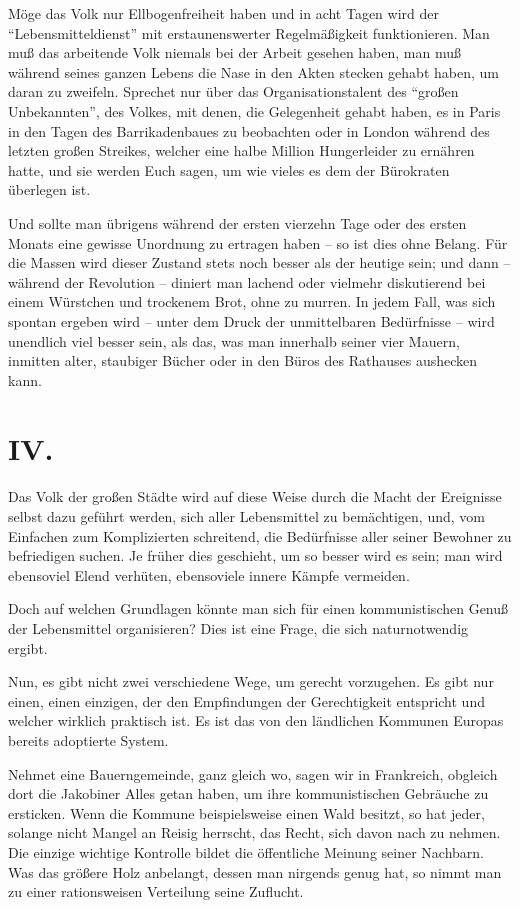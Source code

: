 \documentclass{scrbook}
\begin{document}
Möge das Volk nur Ellbogenfreiheit haben und in acht Tagen wird der ``Lebensmitteldienst'' mit erstaunenswerter Regelmäßigkeit funktionieren. Man muß das arbeitende Volk niemals bei der Arbeit gesehen haben, man muß während seines ganzen Lebens die Nase in den Akten stecken gehabt haben, um daran zu zweifeln. Sprechet nur über das Organisationstalent des ``großen Unbekannten'', des Volkes, mit denen, die Gelegenheit gehabt haben, es in Paris in den Tagen des Barrikadenbaues zu beobachten oder in London während des letzten großen Streikes, welcher eine halbe Million Hungerleider zu ernähren hatte, und sie werden Euch sagen, um wie vieles es dem der Bürokraten überlegen ist.

Und sollte man übrigens während der ersten vierzehn Tage oder des ersten Monats eine gewisse Unordnung zu ertragen haben – so ist dies ohne Belang. Für die Massen wird dieser Zustand stets noch besser als der heutige sein; und dann – während der Revolution – diniert man lachend oder vielmehr diskutierend bei einem Würstchen und trockenem Brot, ohne zu murren. In jedem Fall, was sich spontan ergeben wird – unter dem Druck der unmittelbaren Bedürfnisse – wird unendlich viel besser sein, als das, was man innerhalb seiner vier Mauern, inmitten alter, staubiger Bücher oder in den Büros des Rathauses aushecken kann.

\section*{IV.}

Das Volk der großen Städte wird auf diese Weise durch die Macht der Ereignisse selbst dazu geführt werden, sich aller Lebensmittel zu bemächtigen, und, vom Einfachen zum Komplizierten schreitend, die Bedürfnisse aller seiner Bewohner zu befriedigen suchen. Je früher dies geschieht, um so besser wird es sein; man wird ebensoviel Elend verhüten, ebensoviele innere Kämpfe vermeiden.

Doch auf welchen Grundlagen könnte man sich für einen kommunistischen Genuß der Lebensmittel organisieren? Dies ist eine Frage, die sich naturnotwendig ergibt.

Nun, es gibt nicht zwei verschiedene Wege, um gerecht vorzugehen. Es gibt nur einen, einen einzigen, der den Empfindungen der Gerechtigkeit entspricht und welcher wirklich praktisch ist. Es ist das von den ländlichen Kommunen Europas bereits adoptierte System.

Nehmet eine Bauerngemeinde, ganz gleich wo, sagen wir in Frankreich, obgleich dort die Jakobiner Alles getan haben, um ihre kommunistischen Gebräuche zu ersticken. Wenn die Kommune beispielsweise einen Wald besitzt, so hat jeder, solange nicht Mangel an Reisig herrscht, das Recht, sich davon nach  zu nehmen. Die einzige wichtige Kontrolle bildet die öffentliche Meinung seiner Nachbarn. Was das größere Holz anbelangt, dessen man nirgends genug hat, so nimmt man zu einer rationsweisen Verteilung seine Zuflucht.
\end{document}
